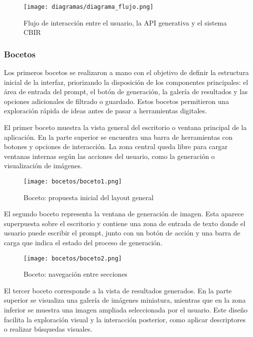 \begin{figure}[H]
    \centering
    \texttt{[image: diagramas/diagrama\_flujo.png]}
    \caption{Flujo de interacción entre el usuario, la API generativa y el sistema CBIR}
    \label{fig:flujo-interaccion}
\end{figure}

\subsubsection{Bocetos}

Los primeros bocetos se realizaron a mano con el objetivo de definir la estructura inicial de la interfaz, priorizando la disposición de los componentes principales: el área de entrada del prompt, el botón de generación, la galería de resultados y las opciones adicionales de filtrado o guardado. Estos bocetos permitieron una exploración rápida de ideas antes de pasar a herramientas digitales.

El primer boceto muestra la vista general del escritorio o ventana principal de la aplicación. En la parte superior se encuentra una barra de herramientas con botones y opciones de interacción. La zona central queda libre para cargar ventanas internas según las acciones del usuario, como la generación o visualización de imágenes.

\begin{figure}[H]
    \centering
    \texttt{[image: bocetos/boceto1.png]}
    \caption{Boceto: propuesta inicial del layout general}
    \label{fig:boceto1}
\end{figure}

El segundo boceto representa la ventana de generación de imagen. Esta aparece superpuesta sobre el escritorio y contiene una zona de entrada de texto donde el usuario puede escribir el prompt, junto con un botón de acción y una barra de carga que indica el estado del proceso de generación.

\begin{figure}[H]
    \centering
    \texttt{[image: bocetos/boceto2.png]}
    \caption{Boceto: navegación entre secciones}
    \label{fig:boceto2}
\end{figure}

El tercer boceto corresponde a la vista de resultados generados. En la parte superior se visualiza una galería de imágenes miniatura, mientras que en la zona inferior se muestra una imagen ampliada seleccionada por el usuario. Este diseño facilita la exploración visual y la interacción posterior, como aplicar descriptores o realizar búsquedas visuales.


